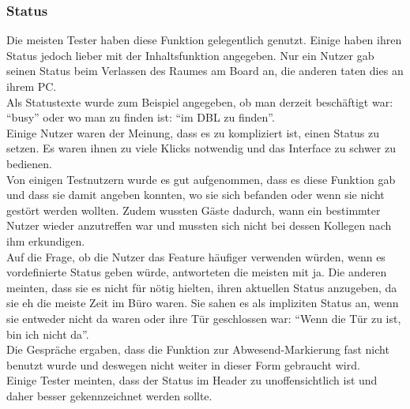 \subsubsection{Status}\label{Status}
Die meisten Tester haben diese Funktion gelegentlich genutzt.
Einige haben ihren Status jedoch lieber mit der Inhaltsfunktion angegeben.
Nur ein Nutzer gab seinen Status beim Verlassen des Raumes am Board an, die anderen taten dies an ihrem PC.
\\
Als Statustexte wurde zum Beispiel angegeben, ob man derzeit beschäftigt war: ``busy'' oder wo man zu finden ist: ``im DBL zu finden''.
\\
Einige Nutzer waren der Meinung, dass es zu kompliziert ist, einen Status zu setzen.
Es waren ihnen zu viele Klicks notwendig und das Interface zu schwer zu bedienen.
\\
Von einigen Testnutzern wurde es gut aufgenommen, dass es diese Funktion gab und dass sie damit angeben konnten, wo sie sich befanden oder wenn sie nicht gestört werden wollten.
Zudem wussten Gäste dadurch, wann ein bestimmter Nutzer wieder anzutreffen war und mussten sich nicht bei dessen Kollegen nach ihm erkundigen.
\\
Auf die Frage, ob die Nutzer das Feature häufiger verwenden würden, wenn es vordefinierte Status geben würde, antworteten die meisten mit ja.
Die anderen meinten, dass sie es nicht für nötig hielten, ihren aktuellen Status anzugeben, da sie eh die meiste Zeit im Büro waren.
Sie sahen es als impliziten Status an, wenn sie entweder nicht da waren oder ihre Tür geschlossen war: ``Wenn die Tür zu ist, bin ich nicht da''.
\\
Die Gespräche ergaben, dass die Funktion zur Abwesend-Markierung fast nicht benutzt wurde und deswegen nicht weiter in dieser Form gebraucht wird.
\\
Einige Tester meinten, dass der Status im Header zu unoffensichtlich ist und daher besser gekennzeichnet werden sollte.


